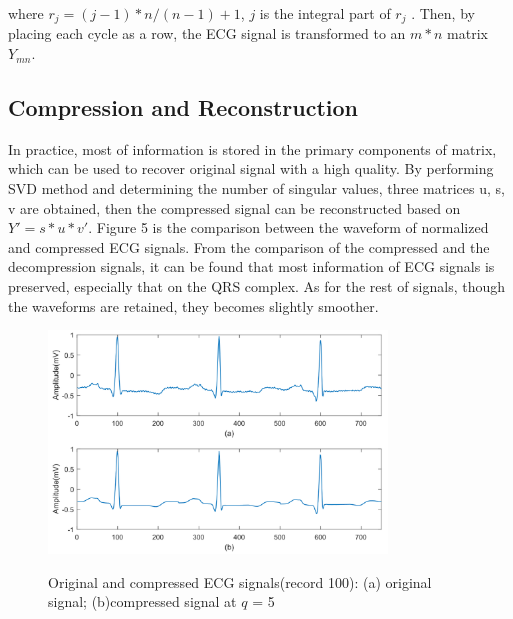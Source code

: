 \documentclass[journal]{IEEEtran}
\begin{document}
where $r_j=(j-1)*n/(n-1)+1$, $j$ is the integral part of $r_j$ .
Then, by placing each cycle as a row, the ECG signal is transformed to an $m*n$ matrix $Y_{mn}$.

\subsection{Compression and Reconstruction}
In practice, most of information is stored in the primary components of matrix, which can be used to recover  original signal with a high quality. By performing SVD method and determining the number of singular values, three matrices u, s, v are obtained, then the compressed signal can be reconstructed based on $Y'=s*u*v'$. Figure 5 is the comparison between the waveform of normalized and compressed ECG signals. From the comparison of the compressed and the decompression signals, it can be found that most information of ECG signals is preserved, especially that on the QRS complex. As for the rest of signals, though the waveforms are retained, they becomes slightly smoother.

\begin{figure}[H]
	\centering
	\includegraphics[width=9cm]{srcAndcompressBbeat3.pdf}\\
	\caption{Original and compressed ECG signals(record 100): (a) original signal; (b)compressed signal at $q$ = 5}
	\label{Doc2}
\end{figure}
\end{document}
